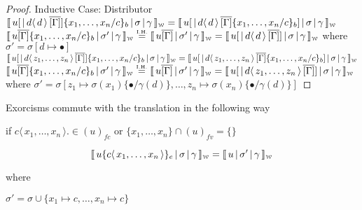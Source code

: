 \documentclass[a4paper,UKenglish,cleveref, autoref]{lipics-v2019}
\newcommand{\fv}[1]{(#1)_{fv}}
\newcommand{\fc}[1]{(#1)_{fc}}
\newcommand{\set}[1]{ \{ #1 \} }
\newcommand{\fake}[3]{#1 \langle \, #2 \, \rangle . #3}
\newcommand{\dist}[5]{#1 [ #2 \, \vert \, \fakedist{#4}{#5} \, #3 ]}
\newcommand{\fakedist}[2]{#1 \langle \, #2 \, \rangle}
\newcommand{\sub}[3]{#1 \{ #2 / #3 \}}
\newcommand{\psub}[3]{#1 \{ #2 / #3 \}_{b}}
\newcommand{\exor}[3]{#1 \{ \fakedist{#2}{#3} \}_{e}}
\newcommand{\weaksymbol}{\mbox{\tiny $\mathcal{W}$}}
\newcommand{\readweakwmap}[3]{\llbracket \, #1 \, \vert \, #2 \, \vert \, #3  \, \rrbracket_{\weaksymbol} }
\newcommand{\IH}{\stackrel{\hbox{\tiny I.H.}}{\hbox{=}}}
\begin{document}
\begin{proof}
\newline
Inductive Case: Distributor
\newline
$\readweakwmap{\dist{u}{}{\overline{[\Gamma]}}{d}{d} \psub{}{x_{1}, \dots, x_{n}}{c}}{\sigma}{\gamma} = \readweakwmap{\dist{u}{}{\overline{[\Gamma]} \psub{}{x_{1}, \dots, x_{n}}{c}}{d}{d} }{\sigma}{\gamma}$
\newline
$\readweakwmap{u \overline{[\Gamma]} \psub{}{x_{1}, \dots, x_{n}}{c}}{\sigma'}{\gamma} \IH \readweakwmap{u \overline{[\Gamma]} }{\sigma'}{\gamma} = \readweakwmap{\dist{u}{}{\overline{[\Gamma]}}{d}{d}}{\sigma}{\gamma}$
\newline
where $\sigma' = \sigma [d \mapsto \bullet]$
\newline
\newline
$\readweakwmap{\dist{u}{}{\overline{[\Gamma]}}{d}{z_{1}, \dots, z_{n}}\psub{}{x_{1}, \dots, x_{n}}{c}}{\sigma}{\gamma} = \readweakwmap{\dist{u}{}{\overline{[\Gamma]} \psub{}{x_{1}, \dots, x_{n}}{c}}{d}{z_{1}, \dots, z_{n}} }{\sigma}{\gamma}$
\newline
$\readweakwmap{u \overline{[\Gamma]} \psub{}{x_{1}, \dots, x_{n}}{c}}{\sigma'}{\gamma} \IH \readweakwmap{u \overline{[\Gamma]} }{\sigma'}{\gamma} = \readweakwmap{\dist{u}{}{\overline{[\Gamma]}}{d}{z_{1}, \dots, z_{n}}}{\sigma}{\gamma}$
\newline
where
\newline
$\sigma' = \sigma [z_{1} \mapsto \sigma(x_{1}) \sub{}{\bullet}{\gamma(d)}, \dots, z_{n} \mapsto \sigma(x_{n}) \sub{}{\bullet}{\gamma(d)}]$
\end{proof}

\begin{proposition}
\label{prop:exorcommweak}
Exorcisms commute with the translation in the following way

if $\fake{c}{x_{1}, \dots, x_{n}} \in \fc{u}$ or $\set{x_{1}, \dots, x_{n}} \cap \fv{u} = \set{}$

$$\readweakwmap{u \exor{}{c}{x_{1}, \dots, x_{n}}}{\sigma}{\gamma} = \readweakwmap{u}{\sigma'}{\gamma}$$

where

$\sigma' = \sigma \cup \set{x_{1} \mapsto c, \dots , x_{n} \mapsto c}$
\end{proposition}
\end{document}
